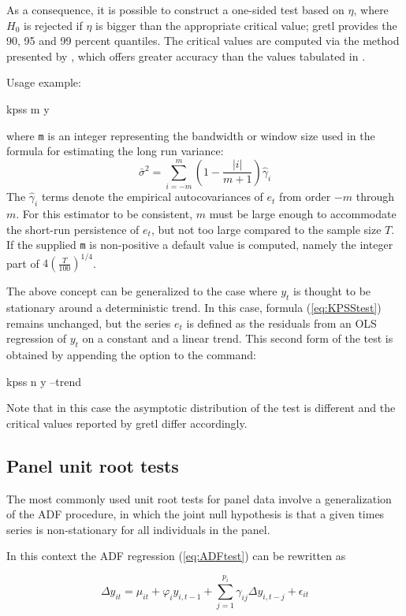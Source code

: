 As a consequence, it is possible to construct a one-sided test based
on $\eta$, where $H_0$ is rejected if $\eta$ is bigger than the
appropriate critical value; gretl provides the 90, 95 and 99
percent quantiles. The critical values are computed via the method
presented by \cite{sephton95}, which offers greater accuracy than the
values tabulated in \cite{KPSS92}.

Usage example:
\begin{code}
kpss m y
\end{code}
where \verb|m| is an integer representing the bandwidth or window
size used in the formula for estimating the long run variance:
\[
  \bar{\sigma}^2 = \sum_{i=-m}^m \left( 1 - \frac{|i|}{m+1} \right) \hat{\gamma}_i
\]
The $\hat{\gamma}_i$ terms denote the empirical autocovariances of
$e_t$ from order $-m$ through $m$.  For this estimator to be
consistent, $m$ must be large enough to accommodate the short-run
persistence of $e_t$, but not too large compared to the sample size
$T$.  If the supplied \verb|m| is non-positive a default value is
computed, namely the integer part of $4 \left( \frac{T}{100}
\right)^{1/4}$.

The above concept can be generalized to the case where $y_t$ is
thought to be stationary around a deterministic trend. In this case,
formula (\ref{eq:KPSStest}) remains unchanged, but the series $e_t$ is
defined as the residuals from an OLS regression of $y_t$ on a constant
and a linear trend. This second form of the test is obtained by
appending the  option to the  command:
\begin{code}
kpss n y --trend
\end{code}
Note that in this case the asymptotic distribution of the test is
different and the critical values reported by gretl differ
accordingly.


\subsection{Panel unit root tests}
\label{sec:panel-uroot}

The most commonly used unit root tests for panel data involve a
generalization of the ADF procedure, in which the joint null
hypothesis is that a given times series is non-stationary for all
individuals in the panel.

In this context the ADF regression (\ref{eq:ADFtest}) can be rewritten
as

\begin{equation}
  \label{eq:panelADF}
  \Delta y_{it} = \mu_{it} + \varphi_i y_{i,t-1} + \sum_{j=1}^{p_i} \gamma_{ij} \Delta
  y_{i,t-j} + \epsilon_{it}
\end{equation}

